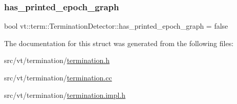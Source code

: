 \mbox{\label{structvt_1_1term_1_1_termination_detector_a68afeac40869ccc50882f717106b382f}} 
\subsubsection{\texorpdfstring{has\+\_\+printed\+\_\+epoch\+\_\+graph}{has\_printed\_epoch\_graph}}
{\footnotesize\ttfamily bool vt\+::term\+::\+Termination\+Detector\+::has\+\_\+printed\+\_\+epoch\+\_\+graph = false\hspace{0.3cm}{\ttfamily [private]}}



The documentation for this struct was generated from the following files\+:\begin{DoxyCompactItemize}
\item 
src/vt/termination/\hyperlink{termination_8h}{termination.\+h}\item 
src/vt/termination/\hyperlink{termination_8cc}{termination.\+cc}\item 
src/vt/termination/\hyperlink{termination_8impl_8h}{termination.\+impl.\+h}\end{DoxyCompactItemize}
